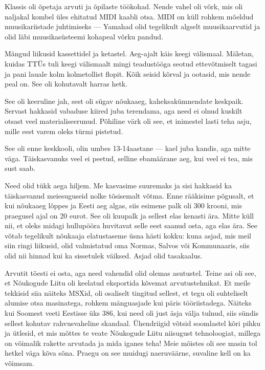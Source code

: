 
Klassis oli õpetaja arvuti ja õpilaste töökohad. Nende vahel oli võrk, mis 
oli naljakal kombel üles ehitatud MIDI kaabli otsa. MIDI on küll rohkem mõeldud muusikariistade juhtimiseks --- Yamahad olid tegelikult algselt 
muusikaarvutid ja olid läbi muusikasüsteemi kohapeal võrku pandud.

Mängud liikusid kassettidel ja ketastel. Aeg-ajalt käis keegi välismaal. Mäletan, kuidas TTÜs tuli keegi välismaalt 
mingi teadustööga seotud ettevõtmiselt tagasi ja pani lauale kolm kolmetollist flopit. Kõik seisid kõrval ja ootasid, mis 
nende peal on. See oli kohutavalt harras hetk.


See oli keeruline jah, sest oli sügav nõukaaeg, 
kaheksakümnendate keskpaik. Servast hakkasid vabaduse kiired juba 
terendama, aga need ei olnud kuskilt otsast veel materialiseerunud. Põhiline 
värk oli see, et inimestel lasti teha asju, mille eest varem 
oleks türmi pistetud.


See oli enne keskkooli, olin umbes 13-14aastane --- kael juba kandis, aga mitte väga. 
Täiskasvanuks veel ei peetud, selline ebamäärane aeg, kui veel ei
tea, mis sust saab.


Need olid tükk aega hiljem. Me kasvasime suuremaks ja sisi hakkasid ka täiskasvanud meiesuguseid nolke 
tõsisemalt võtma. Enne rääkisime põgusalt, et kui nõukaaeg lõppes 
ja Eesti aeg algas, siis esimene palk oli 300 
krooni, mis praegusel ajal on 20 eurot. See oli kuupalk ja sellest elas kenasti ära. Mitte küll nii, et oleks midagi hullupööra huvitavat selle eest 
saanud osta, aga elas ära. See võtab tegelikult nõukaaja 
elatustaseme üsna hästi kokku: kuna asjad, mis meil siin ringi liikusid, olid 
valmistatud oma Normas, Salvos või Kommunaaris, siis olid nii hinnad kui ka sissetulek väiksed. Asjad 
olid tasakaalus. 


Arvutit tõesti ei osta, aga need vahendid olid olemas asutustel. 
Teine asi oli see, et Nõukogude Liitu oli keelatud eksportida kõvemat 
arvutustehnikat. Et meile tekkisid siia näiteks MSXid, oli osaliselt 
tingitud sellest, et tegu oli suhteliselt alumise otsa masinatega, rohkem 
mänguasjade kui päris tööriistadega. Näiteks kui 
Soomest veeti Eestisse üks 386, kui need oli just äsja välja tulnud, siis sündis
sellest kohutav rahvusvaheline skandaal. Ühendriigid võtsid soomlastel kõri 
pihku ja ütlesid, et mis mõttes te veate Nõukogude Liitu niisugust 
tehnoloogiat, millega on võimalik rakette arvutada ja mida iganes teha! Meie 
mõistes oli see masin tol hetkel väga kõva sõna. Praegu on see muidugi 
naeruväärne, suvaline kell on ka võimsam.

